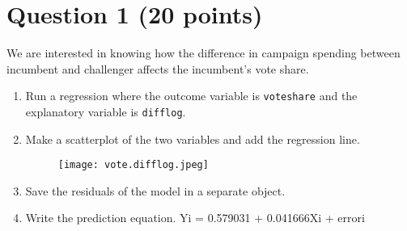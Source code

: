 \documentclass[12pt,letterpaper]{article}
\begin{document}
\section*{Question 1 (20 points)}
\vspace{.25cm}
\noindent We are interested in knowing how the difference in campaign spending between incumbent and challenger affects the incumbent's vote share. 
	\begin{enumerate}
		\item Run a regression where the outcome variable is \texttt{voteshare} and the explanatory variable is \texttt{difflog}.	\vspace{1cm}
 
		\vspace{.5cm}
		
		
		\item Make a scatterplot of the two variables and add the regression line. 	\vspace{1cm}
 	
\begin{figure} [H]
	\texttt{[image: vote.difflog.jpeg]}
\end{figure}		
\vspace{.5cm}
		\item Save the residuals of the model in a separate object.	\vspace{1cm}
 	
	\vspace{.5cm}

		\item Write the prediction equation.
		\noindent Yi = 0.579031 + 0.041666Xi + errori
	\end{enumerate}
	
\newpage
\end{document}
